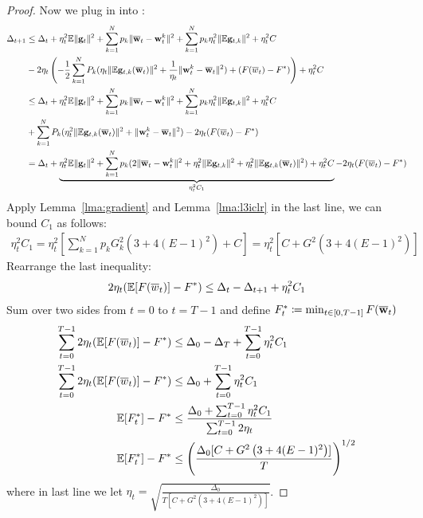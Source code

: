 \begin{proof}
Now we plug in \eq{\ref{eq:cvxa24}} into \eq{\ref{eq:cvxmain2}}:
\begin{align}
	\Delta_{t+1} & \leq \Delta_t + 
	\eta_{t}^{2} \mathbb{E}\| {\mathbf{g}}_{t} \|^{2} + \sum_{k=1}^N p_k \|\overline{{\mathbf{w}}}_t - {\mathbf{w}}_t^k\|^2 +  \sum_{k=1}^N p_k \eta_t^2 \|\mathbb{E} {\mathbf{g}}_{t,k}\|^2 + \eta_t^2 C \\
	 &- 2 \eta_t \left(-\frac{1}{2} \sum_{k=1}^{N} P_{k} (\eta_t \|\mathbb{E} {\mathbf{g}}_{t,k}(\overline{{\mathbf{w}}}_t) \|^2 + \frac{1}{\eta_t} \|{\mathbf{w}}_t^k - \overline{{\mathbf{w}}}_t\|^2) + (F(\overline{w}_t) - F^*) \right)  + \eta_t^2 C \\
	& \leq \Delta_t + 
	\eta_{t}^{2} \mathbb{E}\| {\mathbf{g}}_{t} \|^{2} + \sum_{k=1}^N p_k \|\overline{{\mathbf{w}}}_t - {\mathbf{w}}_t^k\|^2 +  \sum_{k=1}^N p_k \eta_t^2 \|\mathbb{E} {\mathbf{g}}_{t,k}\|^2  + \eta_t^2 C  \\
	& +\sum_{k=1}^{N} P_{k} (\eta_t^2 \|\mathbb{E} {\mathbf{g}}_{t,k}(\overline{{\mathbf{w}}}_t) \|^2 + \|{\mathbf{w}}_t^k - \overline{{\mathbf{w}}}_t\|^2) - 2\eta_t (F(\overline{w}_t) - F^*) \\
	& = \Delta_t + \underbrace{\eta_{t}^{2} \mathbb{E}\| {\mathbf{g}}_{t} \|^{2} +\sum_{k=1}^N p_k  ( 2\|\overline{{\mathbf{w}}}_t - {\mathbf{w}}_t^k\|^2  +  \eta_t^2 \|\mathbb{E} {\mathbf{g}}_{t,k}\|^2 + \eta_t^2 \|\mathbb{E} {\mathbf{g}}_{t,k}(\overline{{\mathbf{w}}}_t) \|^2 ) + \eta_t^2 C }_{\eta_t^2C_1}  - 2\eta_t (F(\overline{w}_t) - F^*) \label{eq:main3}
\end{align}
Apply Lemma~\ref{lma:gradient} and Lemma~\ref{lma:l3iclr} in the last line, we can bound $C_1$ as follows:
\begin{align}
\eta_t^2 C_1  = \eta_t^2 [\sum_{k=1}^N p_k G_k^2 \left(3 + 4(E-1)^2\right) + C]  = \eta_t^2 [C+ G^2 \left(3 + 4(E-1)^2\right)]
\end{align}
Rearrange the last inequality:
\begin{align}
	2\eta_t (\mathbb{E}[F(\overline{w}_t)] - F^*) \leq \Delta_t - \Delta_{t+1} + \eta_t^2 C_1 
\end{align}
Sum over two sides from $t=0$ to $t = T- 1$ and define $F^*_t \coloneqq \min_{t \in [0, T-1]} F(\overline{{\mathbf{w}}}_t)$
\begin{align}
	\sum_{t=0}^{T-1} 2\eta_t(\mathbb{E}[F(\overline{w}_t)] - F^*) & \leq \Delta_0 - \Delta_T + \sum_{t=0}^{T-1} \eta_t^2 C_1 \\
	\sum_{t=0}^{T-1} 2\eta_t(\mathbb{E}[F(\overline{w}_t)]- F^*) & \leq \Delta_0 + \sum_{t=0}^{T-1} \eta_t^2 C_1 \\
    \mathbb{E}[F^*_t] - F^* &\leq \frac{\Delta_0 + \sum_{t=0}^{T-1} \eta_t^2C_1 }{ \sum_{t=0}^{T-1}  2 \eta_t}\\
    \mathbb{E}[F^*_t] - F^* &\leq  \left(\frac{\Delta_0[C+ G^2 \left(3 + 4(E-1)^2\right)]}{T}\right)^{1/2}
\end{align}
where in last line we let $\eta_t  = \sqrt{ \frac{\Delta_0}{T[C+ G^2 \left(3 + 4(E-1)^2\right)]}}$.


\end{proof}
